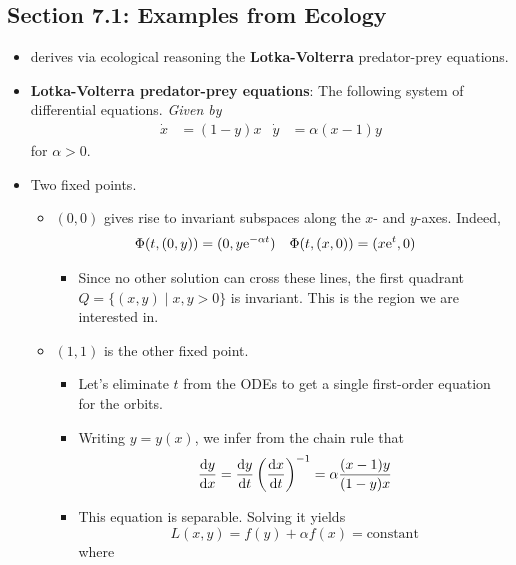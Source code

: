 \documentclass[../notes.tex]{subfiles}
\begin{document}
\subsection*{Section 7.1: Examples from Ecology}
\begin{itemize}
    \item \textcite{bib:Teschl} derives via ecological reasoning the \textbf{Lotka-Volterra} predator-prey equations.
    \item \textbf{Lotka-Volterra predator-prey equations}: The following system of differential equations. \emph{Given by}
    \begin{align*}
        \dot{x} &= (1-y)x&
        \dot{y} &= \alpha(x-1)y
    \end{align*}
    for $\alpha>0$.
    \item Two fixed points.
    \begin{itemize}
        \item $(0,0)$ gives rise to invariant subspaces along the $x$- and $y$-axes. Indeed,
        \begin{align*}
            \Phi(t,(0,y)) &= (0,y\e[-\alpha t])&
            \Phi(t,(x,0)) &= (x\e[t],0)
        \end{align*}
        \begin{itemize}
            \item Since no other solution can cross these lines, the first quadrant $Q=\{(x,y)\mid x,y>0\}$ is invariant. This is the region we are interested in.
        \end{itemize}
        \item $(1,1)$ is the other fixed point.
        \begin{itemize}
            \item Let's eliminate $t$ from the ODEs to get a single first-order equation for the orbits.
            \item Writing $y=y(x)$, we infer from the chain rule that
            \begin{equation*}
                \dv{y}{x} = \dv{y}{t}\left( \dv{x}{t} \right)^{-1}
                = \alpha\frac{(x-1)y}{(1-y)x}
            \end{equation*}
            \item This equation is separable. Solving it yields
            \begin{equation*}
                L(x,y) = f(y)+\alpha f(x) = \text{constant}
            \end{equation*}
            where
            \begin{equation*}

\end{equation*}
\end{itemize}
\end{itemize}
\end{itemize}
\end{document}
